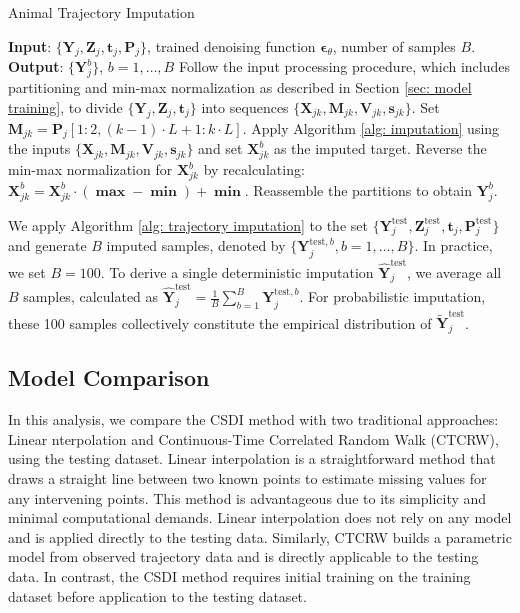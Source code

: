 \documentclass[11pt]{article}
\begin{document}
\begin{algorithm}
\caption{Animal Trajectory Imputation}\label{alg: trajectory imputation}
\begin{algorithmic}[1]
\State \textbf{Input}: $\{\bm{Y}_j, \bm{Z}_j, \bm{t}_j, \bm{P}_j\}$, trained denoising function $\bm{\epsilon}_{\theta}$, number of samples $B$.
\State \textbf{Output}: $\{\bm{Y}_j^b\}$, $b=1,\ldots, B$
    \State Follow the input processing procedure, which includes partitioning and min-max normalization as described in Section \ref{sec: model training}, to divide $\{\bm{Y}_j, \bm{Z}_j, \bm{t}_j\}$ into sequences $\{\bm{X}_{jk}, \bm{M}_{jk}, \bm{V}_{jk}, \bm{s}_{jk}\}$.
    	\State Set $\bm{M}_{jk} = \bm{P}_j[1:2, (k-1) \cdot L+1 : k \cdot L]$.
        \State Apply Algorithm \ref{alg: imputation} using the inputs $\{\bm{X}_{jk}, \bm{M}_{jk}, \bm{V}_{jk}, \bm{s}_{jk}\}$ and set $\bm{X}_{jk}^b$ as the imputed target.
        \State Reverse the min-max normalization for $\bm{X}_{jk}^b$ by recalculating: $\bm{X}_{jk}^b = \bm{X}_{jk}^b \cdot (\bm{\max} - \bm{\min}) + \bm{\min}$.
    \EndFor
    \State Reassemble the partitions to obtain $\bm{Y}_j^b$.
\EndFor
\end{algorithmic}
\end{algorithm}

We apply Algorithm \ref{alg: trajectory imputation} to the set $\{\bm{Y}_j^{\mathrm{test}}, \bm{Z}_j^{\mathrm{test}}, \bm{t}_j, \bm{P}_j^{\mathrm{test}}\}$ and generate $B$ imputed samples, denoted by $\{\bm{Y}_j^{\mathrm{test},b}, b=1,\ldots, B\}$. In practice, we set $B=100$. To derive a single deterministic imputation $\hat{\bm{Y}}_j^{\mathrm{test}}$, we average all $B$ samples, calculated as $\hat{\bm{Y}}_j^{\mathrm{test}} = \frac{1}{B}\sum_{b=1}^B \bm{Y}_j^{\mathrm{test},b}$. For probabilistic imputation, these 100 samples collectively constitute the empirical distribution of $\tilde{\bm{Y}}_j^{\mathrm{test}}$.
















\subsection{Model Comparison}
In this analysis, we compare the CSDI method with two traditional approaches: Linear nterpolation and Continuous-Time Correlated Random Walk (CTCRW), using the testing dataset. Linear interpolation is a straightforward method that draws a straight line between two known points to estimate missing values for any intervening points. This method is advantageous due to its simplicity and minimal computational demands. Linear interpolation does not rely on any model and is applied directly to the testing data. Similarly, CTCRW builds a parametric model from observed trajectory data and is directly applicable to the testing data. In contrast, the CSDI method requires initial training on the training dataset before application to the testing dataset.
\end{document}
